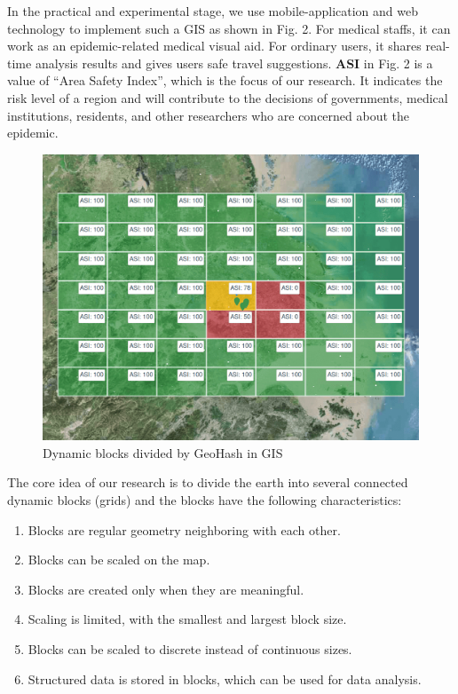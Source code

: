 \documentclass[conference]{IEEEtran}
\begin{document}
In the practical and experimental stage, we use mobile-application and web technology to implement such a GIS as shown in Fig. 2.
For medical staffs, it can work as an epidemic-related medical visual aid.
For ordinary users, it shares real-time analysis results and gives users safe travel suggestions.
\textbf{ASI} in Fig. 2 is a value of ``Area Safety Index'', which is the focus of our research.
It indicates the risk level of a region and will contribute to the decisions of governments, medical institutions, residents, and other researchers who are concerned about the epidemic.
\begin{figure}[h]
    \includegraphics[width=\linewidth]{geogrids.png}
    \caption{Dynamic blocks divided by GeoHash in GIS}
\end{figure}

The core idea of our research is to divide the earth into several connected dynamic blocks (grids) and the blocks have the following characteristics:
\begin{enumerate}
    \item Blocks are regular geometry neighboring with each other.
    \item Blocks can be scaled on the map.
    \item Blocks are created only when they are meaningful.
    \item Scaling is limited, with the smallest and largest block size.
    \item Blocks can be scaled to discrete instead of continuous sizes.
    \item Structured data is stored in blocks, which can be used for data analysis.
\end{enumerate}
\end{document}
